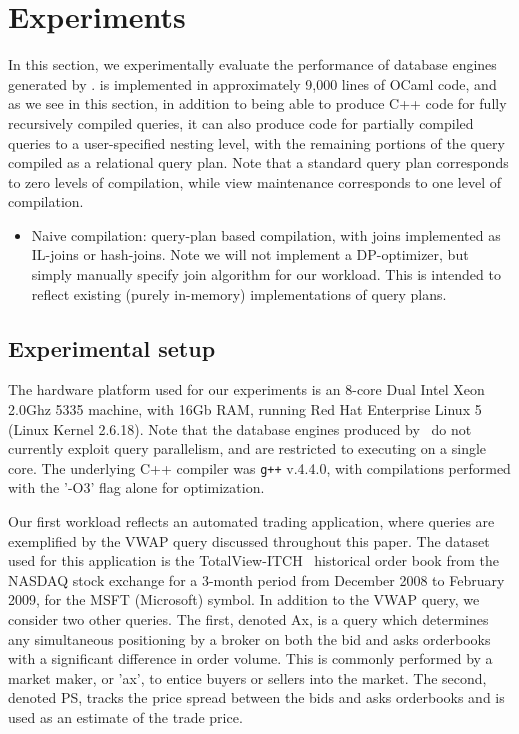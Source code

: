 \section{Experiments}

In this section, we experimentally evaluate the performance of database engines
generated by \compiler. \compiler is implemented in approximately 9,000 lines of
OCaml code, and as we see in this section, in addition to being able to produce
C++ code for fully recursively compiled queries, it can also produce code for
partially compiled queries to a user-specified nesting level, with the remaining
portions of the query compiled as a relational query plan. Note that a standard
query plan corresponds to zero levels of compilation, while view maintenance
corresponds to one level of compilation.

\begin{itemize}
    \item Naive compilation: query-plan based compilation, with joins
      implemented as IL-joins or hash-joins. Note we will not implement a
      DP-optimizer, but simply manually specify join algorithm for our workload.
      This is intended to reflect existing (purely in-memory) implementations of
      query plans.
\end{itemize}

\subsection{Experimental setup}
The hardware platform used for our experiments is an 8-core Dual Intel Xeon
2.0Ghz 5335 machine, with 16Gb RAM, running Red Hat Enterprise Linux 5 (Linux
Kernel 2.6.18). Note that the database engines produced by \compiler\ do not
currently exploit query parallelism, and are restricted to executing on a single
core. The underlying C++ compiler was \texttt{g++} v.4.4.0, with compilations
performed with the '-O3' flag alone for optimization.

Our first workload reflects an automated trading application, where queries are
exemplified by the VWAP query discussed throughout this paper.  The dataset used
for this application is the TotalView-ITCH~\cite{totalview-url} historical order
book from the NASDAQ stock exchange for a 3-month period from December 2008 to
February 2009, for the MSFT (Microsoft) symbol. In addition to the VWAP query,
we consider two other queries. The first, denoted Ax, is a query which
determines any simultaneous positioning by a broker on both the bid and asks
orderbooks with a significant difference in order volume. This is commonly
performed by a market maker, or 'ax', to entice buyers or sellers into the
market. The second, denoted PS, tracks the price spread between the bids and
asks orderbooks and is used as an estimate of the trade price.

